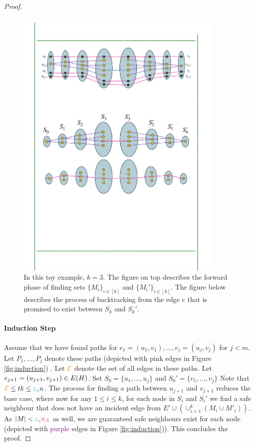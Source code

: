 \documentclass[11pt]{article}
\newcommand{\epsilonA}{\textcolor{ballblue}{\epsilon_a}}
\newcommand{\na}{\textcolor{razzmatazz}{n_A}}
\begin{document}
\begin{proof}
\begin{figure}
	\includegraphics[width=0.9\textwidth
	]{assets/BaseA.pdf}
	\caption{In this toy example, $k=3$. The figure on top describes the forward phase of finding sets $\{M_i\}_{i\in [k]}$ and $\{M_i'\}_{i\in [k]}$. The figure below describes the process of backtracking from the edge $e$ that is promised to exist between $S_k$ and $S_k'$.}
	\label{fig:baseB}
\end{figure}



\paragraph{Induction Step}
	
Assume that we have found paths for $e_1 = (u_1, v_1), \dots, e_j=(u_j, v_j)$ for $j < m$.
Let $P_1, \dots, P_j$ denote these paths (depicted with \textcolor{carminepink}{pink} edges in Figure \ref{fig:induction}) .
Let $\textcolor{orange}{\mathcal{E}}$ denote the set of all edges in these paths.
Let $e_{j+1} = (u_{j+1},v_{j+1}) \in E(H)$.
Set $S_0 = \{u_1, \dots, u_j\}$ and $S_0' = \{v_1, \dots, v_j\}$
Note that $\GlobalEdgeSet \leq tk \leq \epsilonA n$.
The process for finding a path between $u_{j+1}$ and $v_{j+1}$ reduces the base case, where now for any $1 \leq i \leq k$, for each node in $S_i$ and $S_i'$ we find a safe neighbour that does not have an incident  edge from $E' \cup (\cup_{i=1}^k (M_i \cup M'_i))$. As $|M| < \epsilonA\na$ as well, we are guaranteed safe neighbours exist for each node (depicted with \textcolor{purple}{purple} edges in Figure \ref{fig:induction})).
This concludes the proof.


\end{proof}
\end{document}
